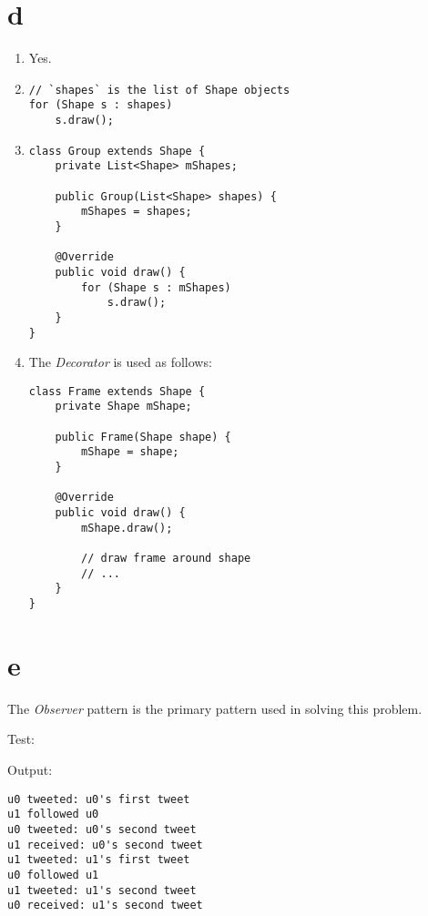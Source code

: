 \documentclass[11pt]{article}
\begin{document}
\section*{d}
\begin{enumerate}
  \item Yes.
  \item
    \begin{minipage}[t]{\linewidth}
      \begin{lstlisting}
// `shapes` is the list of Shape objects
for (Shape s : shapes)
    s.draw();
      \end{lstlisting}
    \end{minipage}
  \item
    \begin{minipage}[t]{\linewidth}
      \begin{lstlisting}
class Group extends Shape {
    private List<Shape> mShapes;

    public Group(List<Shape> shapes) {
        mShapes = shapes;
    }

    @Override
    public void draw() {
        for (Shape s : mShapes)
            s.draw();
    }
}
      \end{lstlisting}
    \end{minipage}
  \item
    \begin{minipage}[t]{\linewidth}
      The \textit{Decorator} is used as follows:
      \begin{lstlisting}
class Frame extends Shape {
    private Shape mShape;

    public Frame(Shape shape) {
        mShape = shape;
    }

    @Override
    public void draw() {
        mShape.draw();

        // draw frame around shape
        // ...
    }
}
      \end{lstlisting}
    \end{minipage}
\end{enumerate}

\section*{e}
\begin{minipage}{\linewidth}
  The \textit{Observer} pattern is the primary pattern used in solving this problem.
  
\end{minipage}

\begin{minipage}{\linewidth}
  Test:
  
\end{minipage}

\begin{minipage}{\linewidth}
Output:
\begin{lstlisting}[language={}]
u0 tweeted: u0's first tweet
u1 followed u0
u0 tweeted: u0's second tweet
u1 received: u0's second tweet
u1 tweeted: u1's first tweet
u0 followed u1
u1 tweeted: u1's second tweet
u0 received: u1's second tweet
\end{lstlisting}
\end{minipage}
\end{document}
